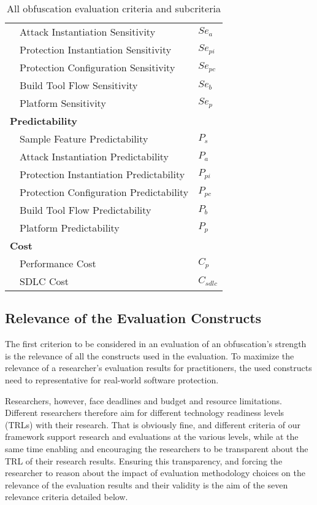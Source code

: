 \begin{table}[t]
\begin{tabular}{c p{6cm} l}
         &  Attack Instantiation Sensitivity & $Se_{a}$ \\       
         &  Protection Instantiation Sensitivity & $Se_{pi}$ \\       
         &  Protection Configuration Sensitivity & $Se_{pc}$ \\       
         &  Build Tool Flow Sensitivity & $Se_{b}$ \\                
         &  Platform Sensitivity & $Se_{p}$ \\ 
   \multicolumn{3}{l}{\textbf{Predictability}}\\
         &  Sample Feature Predictability & $P_{s}$ \\
         &  Attack Instantiation Predictability & $P_{a}$ \\       
         &  Protection Instantiation Predictability & $P_{pi}$ \\       
         &  Protection Configuration Predictability & $P_{pc}$ \\       
         &  Build Tool Flow Predictability & $P_{b}$ \\                
         &  Platform Predictability & $P_{p}$ \\ 
   \multicolumn{3}{l}{\textbf{Cost}}\\
         &  Performance Cost & $C_{p}$ \\
         &  SDLC Cost & $C_{sdlc}$ \\       
         \hline
    \end{tabular}
    \caption{All obfuscation evaluation criteria and subcriteria}
    \label{tab:criteria}
\end{table}


\subsection{Relevance of the Evaluation Constructs}
The first criterion to be considered in an evaluation of an obfuscation's strength is the relevance of all the constructs used in the evaluation. To maximize the relevance of a researcher's evaluation results for practitioners, the used constructs need to representative for real-world software protection. 


Researchers, however, face deadlines and budget and resource limitations. Different researchers therefore aim for different technology readiness levels (TRLs) with their research. That is obviously fine, and different criteria of our framework support research and evaluations at the various levels, while at the same time enabling and encouraging the researchers to be transparent about the TRL of their research results. Ensuring this transparency, and forcing the researcher to reason about the impact of evaluation methodology choices on the relevance of the evaluation results and their validity is the aim of the seven relevance criteria detailed below. 

